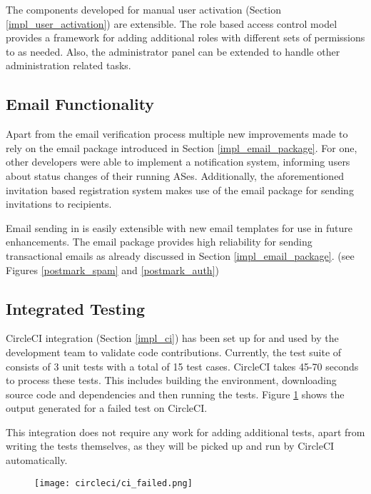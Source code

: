 The components developed for manual user activation  (Section \ref{impl_user_activation}) are extensible. The role based access control model provides a framework for adding additional roles with different sets of permissions to \lcs as needed. Also, the administrator panel can be extended to handle other administration related tasks. 

\subsection{Email Functionality}
\label{eva:email}

Apart from the email verification process multiple new improvements made to \lcs rely on the email package introduced in Section \ref{impl_email_package}. For one, other developers were able to implement a notification system, informing users about status changes of their running ASes. Additionally, the aforementioned invitation based registration system makes use of the email package for sending invitations to recipients.

Email sending in \lcs is easily extensible with new email templates for use in future enhancements.
The email package provides high reliability for sending transactional emails as already discussed in Section \ref{impl_email_package}. (see Figures \ref{postmark_spam} and \ref{postmark_auth})

\subsection{Integrated Testing}
\label{eva:test}

CircleCI integration (Section \ref{impl_ci}) has been set up for \lcs and used by the development team to validate code contributions. Currently, the test suite of \lcs consists of 3 unit tests with a total of 15 test cases. CircleCI takes 45-70 seconds to process these tests. This includes building the environment, downloading source code and dependencies and then running the tests. Figure \ref{ci:failed} shows the output generated for a failed test on CircleCI.

This integration does not require any work for adding additional tests, apart from writing the tests themselves, as they will be picked up and run by CircleCI automatically.

\begin{figure}[h] %
	\centering
	\texttt{[image: circleci/ci\_failed.png]}
	\label{ci:failed}
\end{figure}


